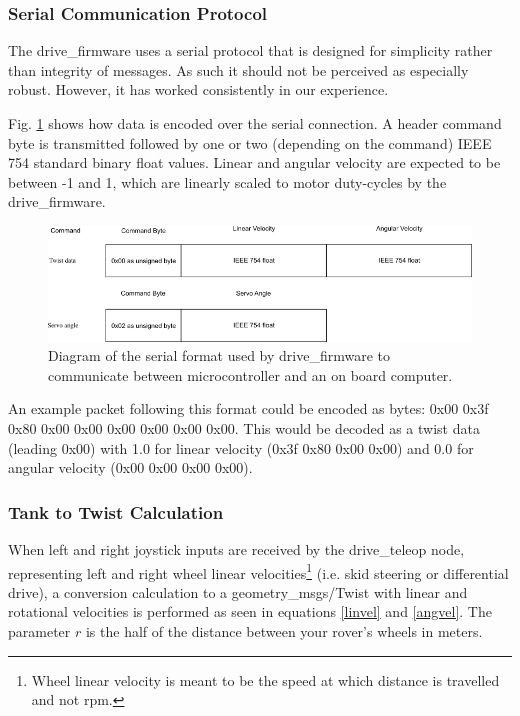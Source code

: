 \documentclass[runningheads,a4paper]{llncs}
\begin{document}
\subsubsection*{Serial Communication Protocol}\label{serproto} The drive\_firmware uses a serial protocol that is designed for simplicity rather than integrity of messages. As such it should not be perceived as especially robust. However, it has worked consistently in our experience. 

Fig. \ref{fig:drive_protocol} shows how data is encoded over the serial connection. A header command byte is transmitted followed by one or two (depending on the command) IEEE 754 standard binary float values. Linear and angular velocity are expected to be between -1 and 1, which are linearly scaled to motor duty-cycles by the drive\_firmware.

\begin{figure}[H]
\centering
\includegraphics[width=\textwidth]{drive_protocol}
\caption{Diagram of the serial format used by drive\_firmware to communicate between microcontroller and an on board computer.}
\label{fig:drive_protocol}
\end{figure}

An example packet following this format could be encoded as bytes: 0x00 0x3f 0x80 0x00 0x00 0x00 0x00 0x00 0x00. This would be decoded as a twist data (leading 0x00) with 1.0 for linear velocity (0x3f 0x80 0x00 0x00) and 0.0 for angular velocity (0x00 0x00 0x00 0x00).


\subsubsection*{Tank to Twist Calculation} When left and right joystick inputs are received by the drive\_teleop node, representing left and right wheel linear velocities\footnote{Wheel linear velocity is meant to be the speed at which distance is travelled and not rpm.} (i.e. skid steering or differential drive), a conversion calculation to a geometry\_msgs/Twist with linear and rotational velocities is performed as seen in equations \ref{linvel} and \ref{angvel}. The parameter \(r\) is the half of the distance between your rover's wheels in meters.
\end{document}
